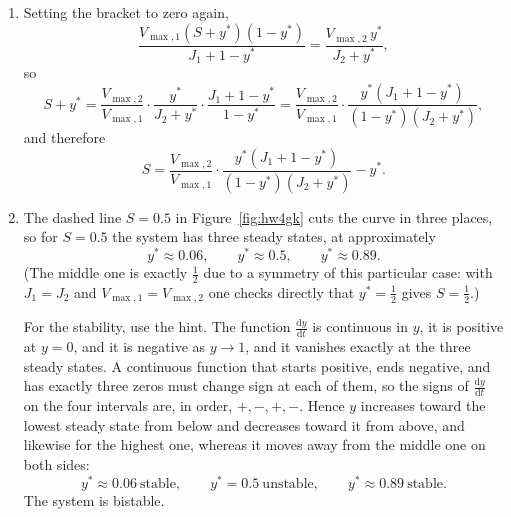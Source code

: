 \documentclass[a4paper,12pt]{article}
\begin{document}
\begin{enumerate}[label=(\alph*)]
A constant right-hand side means $y$ moves at a constant speed and cannot stop in the interior. If $V_{\max,1}>V_{\max,2}$, then $\frac{\text{d}y}{\text{d}t}>0$ throughout, so $y$ increases until it gets close enough to $1$ that the approximation $J_1 \ll 1-y$ fails --- which happens only when $1-y = O(J_1)$. The system therefore settles at $y^* \approx 1-O(J_1)$, that is, almost fully phosphorylated. If $V_{\max,1}<V_{\max,2}$, the same argument run backwards gives $y^* = O(J_2)$, almost fully dephosphorylated.

So, the steady state is essentially $0$ or $1$ depending only on the sign of $V_{\max,1}-V_{\max,2}$, creating a step function, i.e., a switch.

\item Setting the bracket to zero again,
\[ \frac{V_{\max,1}(S+y^*)(1-y^*)}{J_1+1-y^*} = \frac{V_{\max,2}\,y^*}{J_2+y^*} , \]
so
\[ S+y^* = \frac{V_{\max,2}}{V_{\max,1}} \cdot \frac{y^*}{J_2+y^*} \cdot \frac{J_1+1-y^*}{1-y^*}
= \frac{V_{\max,2}}{V_{\max,1}} \cdot \frac{y^*\left( J_1+1-y^* \right)}{\left( 1-y^* \right)\left( J_2+y^* \right)} , \]
and therefore
\[ S = \frac{V_{\max,2}}{V_{\max,1}} \cdot \frac{y^*\left( J_1+1-y^* \right)}{\left( 1-y^* \right)\left( J_2+y^* \right)} - y^* . \]

\item The dashed line $S=0.5$ in Figure~\ref{fig:hw4gk} cuts the curve in three places, so for $S=0.5$ the system has three steady states, at approximately
\[ y^* \approx 0.06, \qquad y^* \approx 0.5, \qquad y^* \approx 0.89 . \]
(The middle one is exactly $\frac{1}{2}$ due to a symmetry of this particular case: with $J_1=J_2$ and $V_{\max,1}=V_{\max,2}$ one checks directly that $y^*=\frac{1}{2}$ gives $S=\frac{1}{2}$.)

For the stability, use the hint. The function $\frac{\text{d}y}{\text{d}t}$ is continuous in $y$, it is positive at $y=0$, and it is negative as $y \to 1$, and it vanishes exactly at the three steady states. A continuous function that starts positive, ends negative, and has exactly three zeros must change sign at each of them, so the signs of $\frac{\text{d}y}{\text{d}t}$ on the four intervals are, in order, $+,-,+,-$. Hence $y$ increases toward the lowest steady state from below and decreases toward it from above, and likewise for the highest one, whereas it moves away from the middle one on both sides:
\[ y^* \approx 0.06 \ \text{stable}, \qquad y^*=0.5 \ \text{unstable}, \qquad y^* \approx 0.89 \ \text{stable}. \]
The system is bistable.


\end{enumerate}
\end{document}
